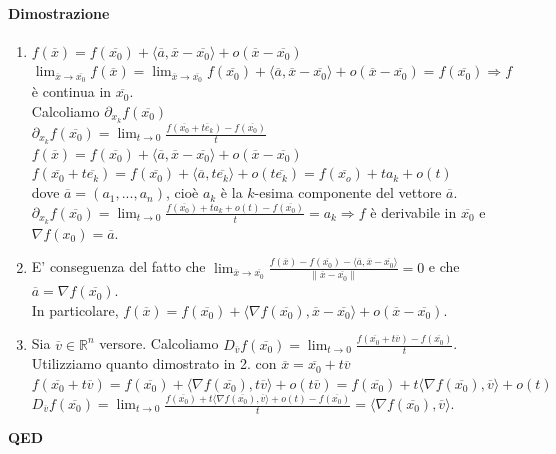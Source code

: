 \documentclass{article}
\newcommand{\R}{\mathbb{R}}
\begin{document}
\paragraph{{Dimostrazione}}
\begin{enumerate}
    \item $f(\overline{x})=f(\overline{x_0})+\langle \overline{a},\overline{x}-\overline{x_0} \rangle+o(\overline{x}-\overline{x_0})$\\
    $\lim_{\overline{x}\rightarrow\overline{x_0}}f(\overline{x})=\lim_{\overline{x}\rightarrow\overline{x_0}}f(\overline{x_0})+\langle \overline{a},\overline{x}-\overline{x_0} \rangle+o(\overline{x}-\overline{x_0})=f(\overline{x_0})\Rightarrow f$ è continua in $\overline{x_0}$.\\
    Calcoliamo $\partial_{x_k}f(\overline{x_0})$\\
    $\partial_{x_k}f(\overline{x_0})=\lim_{t\rightarrow0}\frac{f(\overline{x_0}+t\overline{e}_k)-f(\overline{x_0})}{t}$\\
    $f(\overline{x})=f(\overline{x_0})+\langle\overline{a},\overline{x}-\overline{x_0}\rangle+o(\overline{x}-\overline{x_0})$\\
    $f(\overline{x_0}+t\overline{e_k})=f(\overline{x_0})+\langle\overline{a},t\overline{e_k}\rangle+o(t\overline{e_k})=f(\overline{x_o})+ta_k+o(t) $\\
    dove $\overline{a}=(a_1,...,a_n)$, cioè $a_k$ è la $k$-esima componente del vettore $\overline{a}$.\\
    $\partial_{x_k}f(\overline{x_0})=\lim_{t \rightarrow 0}\frac{f(\overline{x_0})+ta_k+o(t)-f(\overline{x_0})}{t}=a_k \Rightarrow f$ è derivabile in $\overline{x_0}$ e $\nabla f(x_0)=\overline{a}$.
    \item E' conseguenza del fatto che $\lim_{\overline{x}\rightarrow\overline{x_0}}\frac{f(\overline{x})-f(\overline{x_0})-\langle\overline{a},\overline{x}-\overline{x_0}\rangle}{\|\overline{x}-\overline{x_0}\|}=0$ e che $\overline{a}=\nabla f(\overline{x_0})$.\\
    In particolare, $f(\overline{x})=f(\overline{x_0})+\langle \nabla f(\overline{x_0}),\overline{x}-\overline{x_0} \rangle +o(\overline{x}-\overline{x_0})$.
    \item Sia $\overline{v}\in \R^n$ versore. Calcoliamo $D_{\overline{v}}f(\overline{x_0})=\lim_{t\rightarrow0}\frac{f(\overline{x_0}+t\overline{v})-f(\overline{x_0})}{t}$.\\
    Utilizziamo quanto dimostrato in 2. con $\overline{x}=\overline{x_0}+t\overline{v}$\\
    $f(\overline{x_0}+t\overline{v})=f(\overline{x_0})+\langle \nabla f(\overline{x_0}), t\overline{v} \rangle + o(t\overline{v})=f(\overline{x_0})+t\langle \nabla f(\overline{x_0}),\overline{v} \rangle +o(t)$\\
    $D_{\overline{v}}f(\overline{x_0})=\lim_{t\rightarrow 0}\frac{f(\overline{x_0})+t\langle\nabla f(\overline{x_0}),\overline{v}\rangle+o(t)-f(\overline{x_0})}{t}=\langle \nabla f(\overline{x_0}),\overline{v} \rangle$.
\end{enumerate}
\begin{flushright}
\textbf{QED}
\end{flushright}
\end{document}

